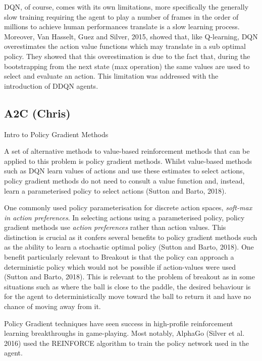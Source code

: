 \documentclass{article}
\begin{document}
DQN, of course, comes with its own limitations, more specifically the generally slow training requiring the agent to play a number of frames in the order of millions to achieve human performances translate is a slow learning process. Moreover, Van Hasselt, Guez and Silver, 2015, showed that, like Q-learning, DQN overestimates the action value functions which may translate in a sub optimal policy. They showed that this overestimation is due to the fact that, during the bootstrapping from the next state (max operation) the same values are used to select and evaluate an action. This limitation was addressed with the introduction of DDQN agents.



\subsection{A2C (Chris)}

Intro to Policy Gradient Methods

A set of alternative methods to value-based reinforcement methods that can be applied to this problem is policy gradient methods. Whilst value-based methods such as DQN learn values of actions and use these estimates to select actions, policy gradient methods do not need to consult a value function and, instead, learn a parameterised policy to select actions (Sutton and Barto, 2018).

One commonly used policy parameterisation for discrete action spaces, \emph{soft-max in action preferences}. In selecting actions using a parameterised policy, policy gradient methods use \emph{action preferences} rather than action values. This distinction is crucial as it confers several benefits to policy gradient methods such as the ability to learn a stochastic optimal policy (Sutton and Barto, 2018). One benefit particularly relevant to Breakout is that the policy can approach a deterministic policy which would not be possible if action-values were used (Sutton and Barto, 2018). This is relevant to the problem of breakout as in some situations such as where the ball is close to the paddle, the desired behaviour is for the agent to deterministically move toward the ball to return it and have no chance of moving away from it.

Policy Gradient techniques have seen success in high-profile reinforcement learning breakthroughs in game-playing. Most notably, AlphaGo (Silver et al. 2016) used the REINFORCE algorithm to train the policy network used in the agent.
\end{document}
